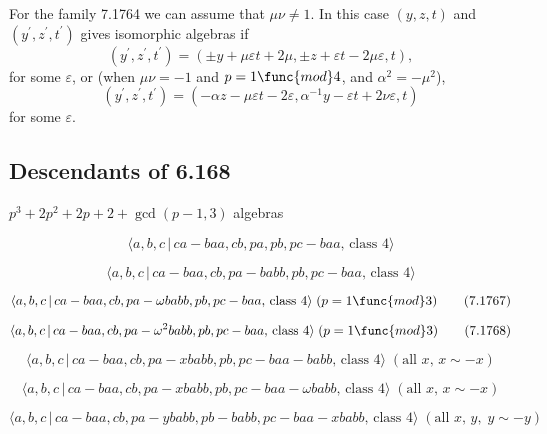 \documentclass[10pt]{article}
\begin{document}
For the family 7.1764 we can assume that $\mu \nu \neq 1$. In this case $%
(y,z,t)$ and $(y^{\prime },z^{\prime },t^{\prime })$ gives isomorphic
algebras if%
\[
(y^{\prime },z^{\prime },t^{\prime })=(\pm y+\mu \varepsilon t+2\mu ,\pm
z+\varepsilon t-2\mu \varepsilon ,t), 
\]%
for some $\varepsilon $, or (when $\mu \nu =-1$ and $p=1\func{mod}4$, and $%
\alpha ^{2}=-\mu ^{2}$),%
\[
(y^{\prime },z^{\prime },t^{\prime })=(-\alpha z-\mu \varepsilon
t-2\varepsilon ,\alpha ^{-1}y-\varepsilon t+2\nu \varepsilon ,t) 
\]%
for some $\varepsilon $.

\subsection{Descendants of 6.168}

$p^{3}+2p^{2}+2p+2+\gcd (p-1,3)$ algebras

\begin{equation}
\langle a,b,c\,|\,ca-baa,cb,pa,pb,pc-baa,\,\text{class }4\rangle 
\tag{7.1765}
\end{equation}

\begin{equation}
\langle a,b,c\,|\,ca-baa,cb,pa-babb,pb,pc-baa,\,\text{class }4\rangle 
\tag{7.1766}
\end{equation}

\begin{equation}
\langle a,b,c\,|\,ca-baa,cb,pa-\omega babb,pb,pc-baa,\,\text{class }4\rangle
\;(p=1\func{mod}3)  \tag{7.1767}
\end{equation}

\begin{equation}
\langle a,b,c\,|\,ca-baa,cb,pa-\omega ^{2}babb,pb,pc-baa,\,\text{class }%
4\rangle \;(p=1\func{mod}3)  \tag{7.1768}
\end{equation}

\begin{equation}
\langle a,b,c\,|\,ca-baa,cb,pa-xbabb,pb,pc-baa-babb,\,\text{class }4\rangle
\;(\text{all }x,\,x\sim -x)  \tag{7.1769}
\end{equation}

\begin{equation}
\langle a,b,c\,|\,ca-baa,cb,pa-xbabb,pb,pc-baa-\omega babb,\,\text{class }%
4\rangle \;(\text{all }x,\,x\sim -x)  \tag{7.1770}
\end{equation}

\begin{equation}
\langle a,b,c\,|\,ca-baa,cb,pa-ybabb,pb-babb,pc-baa-xbabb,\,\text{class }%
4\rangle \;(\text{all }x,\,y,\;y\sim -y)  \tag{7.1771}
\end{equation}
\end{document}
